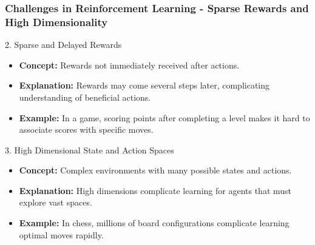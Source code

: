 \documentclass[aspectratio=169]{beamer}
\begin{document}
\begin{frame}[fragile]
    \frametitle{Challenges in Reinforcement Learning - Sparse Rewards and High Dimensionality}
    \begin{block}{2. Sparse and Delayed Rewards}
        \begin{itemize}
            \item \textbf{Concept:} Rewards not immediately received after actions.
            \item \textbf{Explanation:} Rewards may come several steps later, complicating understanding of beneficial actions.
            \item \textbf{Example:} In a game, scoring points after completing a level makes it hard to associate scores with specific moves.
        \end{itemize}
    \end{block}
    
    \begin{block}{3. High Dimensional State and Action Spaces}
        \begin{itemize}
            \item \textbf{Concept:} Complex environments with many possible states and actions.
            \item \textbf{Explanation:} High dimensions complicate learning for agents that must explore vast spaces.
            \item \textbf{Example:} In chess, millions of board configurations complicate learning optimal moves rapidly.
        \end{itemize}
    \end{block}
\end{frame}
\end{document}
